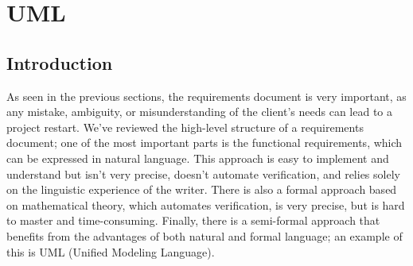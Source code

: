 \section{UML}
\subsection{Introduction}
As seen in the previous sections, the requirements document is very important, as any mistake, ambiguity,
or misunderstanding of the client's needs can lead to a project restart. We've reviewed the high-level
structure of a requirements document; one of the most important parts is the functional requirements, which can
be expressed in natural language. This approach is easy to implement and understand but isn't very precise, doesn't
automate verification, and relies solely on the linguistic experience of the writer. There is also a formal approach
based on mathematical theory, which automates verification, is very precise, but is hard to master and 
time-consuming. Finally, there is a semi-formal approach that benefits from the advantages of both natural and 
formal language; an example of this is UML (Unified Modeling Language).
